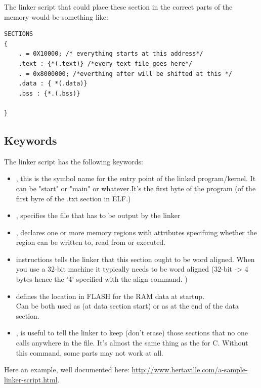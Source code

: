 The linker script that could place these section in the correct parts of the memory would be something like:

\begin{lstlisting}
SECTIONS
{
	. = 0X10000; /* everything starts at this address*/
	.text : {*(.text)} /*every text file goes here*/ 
	. = 0x8000000; /*everthing after will be shifted at this */
	.data : { *(.data)}
	.bss : {*.(.bss)}

}

\end{lstlisting}

\subsection{Keywords}
The linker script has the following keywords:
\begin{itemize}
	\item {}, this is the symbol name for the entry point of the linked program/kernel. It can be "start" or "main" or whatever.It's the first byte of the program (of the first byre of the .txt section in ELF.)
	\item {}, specifies the file that has to be output by the linker
	\item {}, declares one or more memory regions with attributes specifuing whether the region can be written to, read from or executed.
	\item {} instructions tells the linker that this section ought to be word aligned. When you use a 32-bit machine it typically needs to be word aligned (32-bit -> 4 bytes hence the '4' specified with the align command. )
	\item {} defines the location in FLASH for the RAM data at startup. \\ Can be both used as  (at data section start) or as  at the end of the data section.
	\item {}, is useful to tell the linker to keep (don't erase) those sections that no one calls anywhere in the  file. It's almost the same thing as the  for C. Without this command, some parts may not work at all.
\end{itemize}

Here an example, well documented here:  \url{http://www.hertaville.com/a-sample-linker-script.html}.

